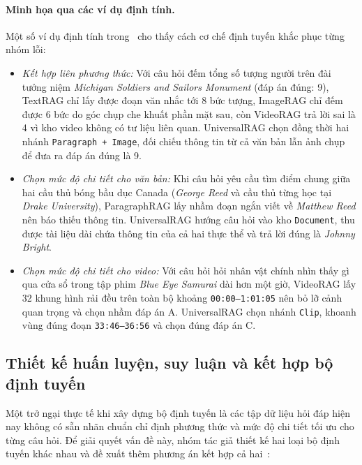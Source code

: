 \paragraph{Minh họa qua các ví dụ định tính.}
Một số ví dụ định tính trong~\cite{yeo2026universalrag} cho thấy cách cơ chế định tuyến khắc phục từng nhóm lỗi:
\begin{itemize}
    \item \textit{Kết hợp liên phương thức:} Với câu hỏi đếm tổng số tượng người trên đài tưởng niệm \textit{Michigan Soldiers and Sailors Monument} (đáp án đúng: 9), TextRAG chỉ lấy được đoạn văn nhắc tới 8 bức tượng, ImageRAG chỉ đếm được 6 bức do góc chụp che khuất phần mặt sau, còn VideoRAG trả lời sai là 4 vì kho video không có tư liệu liên quan. UniversalRAG chọn đồng thời hai nhánh \texttt{Paragraph + Image}, đối chiếu thông tin từ cả văn bản lẫn ảnh chụp để đưa ra đáp án đúng là 9.
    \item \textit{Chọn mức độ chi tiết cho văn bản:} Khi câu hỏi yêu cầu tìm điểm chung giữa hai cầu thủ bóng bầu dục Canada (\textit{George Reed} và cầu thủ từng học tại \textit{Drake University}), ParagraphRAG lấy nhầm đoạn ngắn viết về \textit{Matthew Reed} nên báo thiếu thông tin. UniversalRAG hướng câu hỏi vào kho \texttt{Document}, thu được tài liệu dài chứa thông tin của cả hai thực thể và trả lời đúng là \textit{Johnny Bright}.
    \item \textit{Chọn mức độ chi tiết cho video:} Với câu hỏi hỏi nhân vật chính nhìn thấy gì qua cửa sổ trong tập phim \textit{Blue Eye Samurai} dài hơn một giờ, VideoRAG lấy 32 khung hình rải đều trên toàn bộ khoảng \texttt{00:00--1:01:05} nên bỏ lỡ cảnh quan trọng và chọn nhầm đáp án A. UniversalRAG chọn nhánh \texttt{Clip}, khoanh vùng đúng đoạn \texttt{33:46--36:56} và chọn đúng đáp án C.
\end{itemize}

\subsection{Thiết kế huấn luyện, suy luận và kết hợp bộ định tuyến}
\label{subsec:ur_training}

Một trở ngại thực tế khi xây dựng bộ định tuyến là các tập dữ liệu hỏi đáp hiện nay không có sẵn nhãn chuẩn chỉ định phương thức và mức độ chi tiết tối ưu cho từng câu hỏi. Để giải quyết vấn đề này, nhóm tác giả thiết kế hai loại bộ định tuyến khác nhau và đề xuất thêm phương án kết hợp cả hai~\cite{yeo2026universalrag}:

